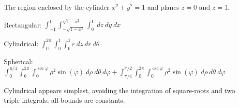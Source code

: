 {The region enclosed by the cylinder $x^2+y^2=1$ and planes $z=0$ and $z=1$.
}
{Rectangular: $\int_{-1}^{1}\int_{-\sqrt{1-x^2}}^{\sqrt{1-x^2}}\int_{0}^{1}\ dz\ dy\ dx$


Cylindrical: $\int_0^{2\pi}\int_0^1\int_{0}^{1}r\ dz\ dr\ d\theta$

Spherical: $\int_0^{\pi/4}\int_0^{2\pi}\int_0^{\sec\varphi} \rho^2\sin(\varphi)\ d\rho\ d\theta\ d\varphi + \int_{\pi/4}^{\pi/2}\int_0^{2\pi}\int_0^{\csc\varphi} \rho^2\sin(\varphi)\ d\rho\ d\theta\ d\varphi$

Cylindrical appears simplest, avoiding the integration of square-roots and two triple integrals; all bounds are constants.
}

